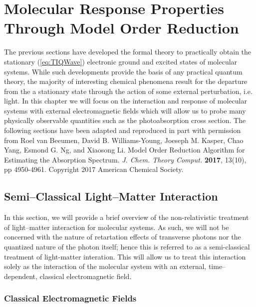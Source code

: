 \chapter{Molecular Response Properties Through Model Order Reduction}


The previous sections have developed the formal theory to practically obtain the stationary 
(\cref{eq:TIQWave}) electronic ground and excited states of molecular systems.
While such developments provide the basis of any practical quantum theory, the majority of interesting chemical
phenomena result for the departure from the a stationary state through the action of some external perturbation,
i.e. light. In this chapter we will focus on the interaction and response of molecular systems with external 
electromagnetic fields which will allow us to probe many physically observable quantities such as
the photoabsorption cross section. The following sections have been adapted and reproduced in part with
permission from Roel van Beeumen, David B. Williams-Young, Joeseph M. Kasper, Chao Yang, Esmond G. Ng,
and Xiaosong Li. Model Order Reduction Algorithm for Estimating the Absorption Spectrum. 
\emph{J. Chem. Theory Comput.} \textbf{2017}, 13(10), pp 4950-4961. Copyright 2017 American Chemical
Society.


\section{Semi--Classical Light--Matter Interaction}
\label{sec:SCLMI}

In this section, we will provide a brief overview of the non-relativistic treatment of
light--matter interaction for molecular systems. As such, we will not be concerned with
the nature of retartation effects of transverse photons nor the quantized nature of
the photon itself; hence this is referred to as a semi-classical treatment of light-matter
interation. This will allow us to treat this interaction solely as the interaction of
the molecular system with an external, time--dependent, classical electromagnetic field. 

\subsection{Classical Electromagnetic Fields}

